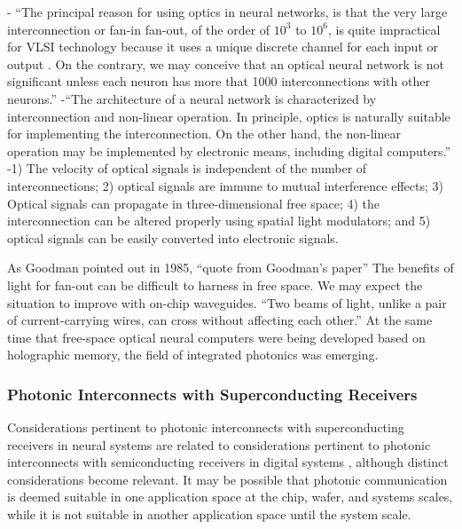 \vspace{3em}
-\cite{juya1996} ``The principal reason for using optics in neural networks, is that the very large interconnection or fan-in fan-out, of the order of $10^3$ to $10^6$, is quite impractical for VLSI technology because it uses a unique discrete channel for each input or output \cite{caki1989}. On the contrary, we may conceive that an optical neural network is not significant unless each neuron has more that 1000 interconnections with other neurons.''
-``The architecture of a neural network is characterized by interconnection and non-linear operation. In principle, optics is naturally suitable for implementing the interconnection. On the other hand, the non-linear operation may be implemented by electronic means, including digital computers.'' \cite{juya1996}
-1) The velocity of optical signals is independent of the number of interconnections; 2) optical signals are immune to mutual interference effects; 3) Optical signals can propagate in three-dimensional free space; 4) the interconnection can be altered properly using spatial light modulators; and 5) optical signals can be easily converted into electronic signals. \cite{juya1996}

\vspace{3em}
As Goodman pointed out in 1985, ``quote from Goodman's paper'' The benefits of light for fan-out can be difficult to harness in free space. We may expect the situation to improve with on-chip waveguides. ``Two beams of light, unlike a pair of current-carrying wires, can cross without affecting each other.'' \cite{abps1987} At the same time that free-space optical neural computers were being developed based on holographic memory, the field of integrated photonics was emerging.

\subsubsection{Photonic Interconnects with Superconducting Receivers}
Considerations pertinent to photonic interconnects with superconducting receivers in neural systems are related to considerations pertinent to photonic interconnects with semiconducting receivers in digital systems \cite{mi2009,mi2017}, although distinct considerations become relevant. It may be possible that photonic communication is deemed suitable in one application space at the chip, wafer, and systems scales, while it is not suitable in another application space until the system scale. 

